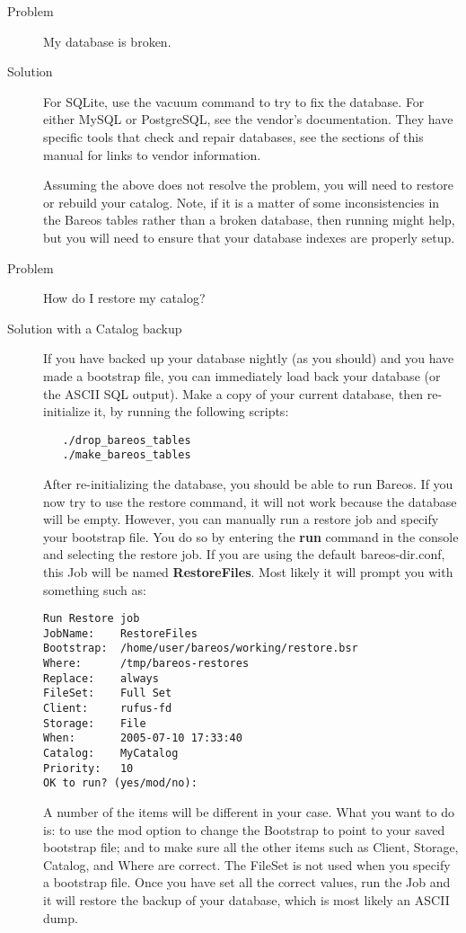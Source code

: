 \begin{description}
\item[Problem]
   My database is broken.
\item[Solution]
   For SQLite, use the vacuum command to try to fix the database. For either
   MySQL or PostgreSQL, see the vendor's documentation. They have specific tools
   that check and repair databases, see the  sections 
   of this manual for links to vendor
   information.

   Assuming the above does not resolve the problem, you will need to restore
   or rebuild your catalog.  Note, if it is a matter of some
   inconsistencies in the Bareos tables rather than a broken database, then
   running  might help, but you will need to ensure
   that your database indexes are properly setup.

\item[Problem]
   How do I restore my catalog?
\item[Solution with a Catalog backup]
   If you have backed up your database nightly (as you should) and you
   have made a bootstrap file, you can immediately load back your
   database (or the ASCII SQL output).  Make a copy of your current
   database, then re-initialize it, by running the following scripts:
\begin{verbatim}
   ./drop_bareos_tables
   ./make_bareos_tables
\end{verbatim}
   After re-initializing the database, you should be able to run
   Bareos. If you now try to use the restore command, it will not
   work because the database will be empty. However, you can manually
   run a restore job and specify your bootstrap file. You do so
   by entering the {\bf run} command in the console and selecting the
   restore job.  If you are using the default bareos-dir.conf, this
   Job will be named {\bf RestoreFiles}. Most likely it will prompt
   you with something such as:

\footnotesize
\begin{verbatim}
Run Restore job
JobName:    RestoreFiles
Bootstrap:  /home/user/bareos/working/restore.bsr
Where:      /tmp/bareos-restores
Replace:    always
FileSet:    Full Set
Client:     rufus-fd
Storage:    File
When:       2005-07-10 17:33:40
Catalog:    MyCatalog
Priority:   10
OK to run? (yes/mod/no):
\end{verbatim}
\normalsize

   A number of the items will be different in your case.  What you want to
   do is: to use the mod option to change the Bootstrap to point to your
   saved bootstrap file; and to make sure all the other items such as
   Client, Storage, Catalog, and Where are correct.  The FileSet is not
   used when you specify a bootstrap file.  Once you have set all the
   correct values, run the Job and it will restore the backup of your
   database, which is most likely an ASCII dump.


\end{description}
